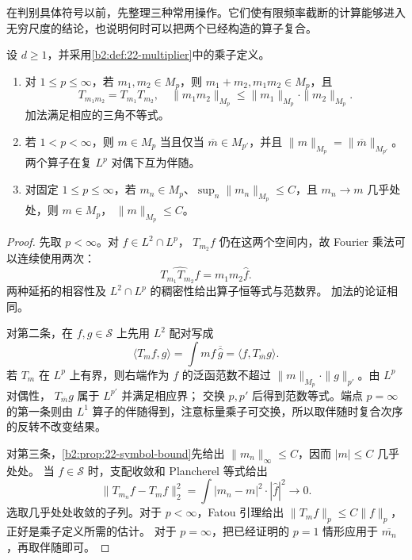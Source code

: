 在判别具体符号以前，先整理三种常用操作。它们使有限频率截断的计算能够进入无穷尺度的结论，也说明何时可以把两个已经构造的算子复合。

\begin{proposition}\label{b2:prop:22-multiplier-calculus}
设 \(d\geq1\)，并采用\cref{b2:def:22-multiplier}中的乘子定义。
\begin{enumerate}
 \item 对 \(1\leq p\leq\infty\)，若 \(m_1,m_2\in M_p\)，则
 \(m_1+m_2,m_1m_2\in M_p\)，且
 \[
 T_{m_1m_2}=T_{m_1}T_{m_2},\quad
 \|m_1m_2\|_{M_p}\leq\|m_1\|_{M_p}\cdot\|m_2\|_{M_p}.
 \]
 加法满足相应的三角不等式。
 \item 若 \(1<p<\infty\)，则
 \(m\in M_p\) 当且仅当 \(\overline m\in M_{p'}\)，并且
 \(\|m\|_{M_p}=\|\overline m\|_{M_{p'}}\)。
 两个算子在复 \(L^p\) 对偶下互为伴随。
 \item 对固定 \(1\leq p\leq\infty\)，若
 \(m_n\in M_p\)、\(\sup_n\|m_n\|_{M_p}\leq C\)，且
 \(m_n\to m\) 几乎处处，则 \(m\in M_p\)，
 \(\|m\|_{M_p}\leq C\)。
\end{enumerate}
\end{proposition}
\begin{proof}
先取 \(p<\infty\)。对 \(f\in L^2\cap L^p\)，
\(T_{m_2}f\) 仍在这两个空间内，故 Fourier 乘法可以连续使用两次：
\[
 \widehat{T_{m_1}T_{m_2}f}=m_1m_2\widehat f.
\]
两种延拓的相容性及 \(L^2\cap L^p\) 的稠密性给出算子恒等式与范数界。
加法的论证相同。

对第二条，在 \(f,g\in\mathcal S\) 上先用 \(L^2\) 配对写成
\[
 \langle T_m f,g\rangle
 =\int m\widehat f\,\overline{\widehat g}
 =\langle f,T_{\overline m}g\rangle.
\]
若 \(T_m\) 在 \(L^p\) 上有界，则右端作为 \(f\) 的泛函范数不超过
\(\|m\|_{M_p}\cdot\|g\|_{p'}\)。由 \(L^p\) 对偶性，
\(T_{\overline m}g\) 属于 \(L^{p'}\) 并满足相应界；
交换 \(p,p'\) 后得到范数等式。端点 \(p=\infty\) 的第一条则由
\(L^1\) 算子的伴随得到，注意标量乘子可交换，所以取伴随时复合次序的反转不改变结果。

对第三条，\cref{b2:prop:22-symbol-bound}先给出
\(\|m_n\|_\infty\leq C\)，因而 \(|m|\leq C\) 几乎处处。
当 \(f\in\mathcal S\) 时，支配收敛和 Plancherel 等式给出
\[
 \|T_{m_n}f-T_mf\|_2^2
 =\int|m_n-m|^2\cdot|\widehat f|^2\longrightarrow0.
\]
选取几乎处处收敛的子列。对于 \(p<\infty\)，Fatou 引理给出
\(\|T_mf\|_p\leq C\|f\|_p\)，正好是乘子定义所需的估计。
对于 \(p=\infty\)，把已经证明的 \(p=1\) 情形应用于
\(\overline{m_n}\)，再取伴随即可。
\end{proof}

